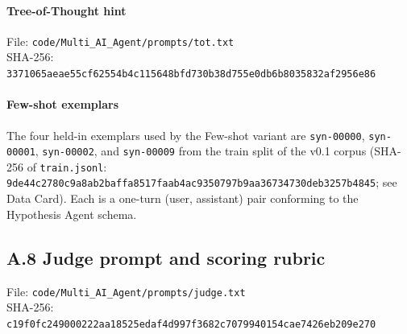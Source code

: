 \paragraph{Tree-of-Thought hint}
File: \texttt{code/Multi\_AI\_Agent/prompts/tot.txt} \\
SHA-256: {\small\texttt{3371065aeae55cf62554b4c115648bfd730b38d755e0db6b8035832af2956e86}}
\begin{small}

\end{small}

\paragraph{Few-shot exemplars}
The four held-in exemplars used by the Few-shot variant are
\texttt{syn-00000}, \texttt{syn-00001}, \texttt{syn-00002}, and
\texttt{syn-00009} from the train split of the v0.1 corpus
(SHA-256 of \texttt{train.jsonl}:
\texttt{9de44c2780c9a8ab2baffa8517faab4ac9350797b9aa36734730deb3257b4845};
see Data Card). Each is a one-turn (user, assistant) pair conforming
to the Hypothesis Agent schema.

\subsection*{A.8 Judge prompt and scoring rubric}
\label{ssec:prompt-judge}
File: \texttt{code/Multi\_AI\_Agent/prompts/judge.txt} \\
SHA-256: {\small\texttt{c19f0fc249000222aa18525edaf4d997f3682c7079940154cae7426eb209e270}}
\begin{small}

\end{small}
